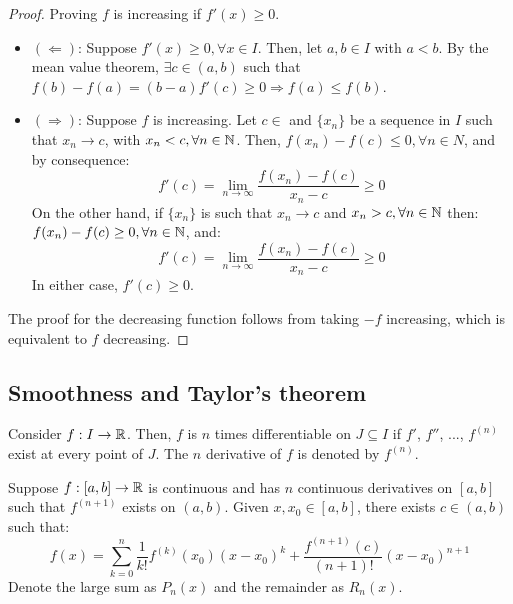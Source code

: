 \begin{proof}
    Proving $f$ is increasing if $f'(x) \geq 0$.
    \begin{itemize}
        \item $(\Longleftarrow)$: Suppose $f'(x) \geq 0, \forall x \in I$. Then, let $a,b \in I$ with $a < b$. By the mean value theorem, $\exists c \in (a,b)$ such that $f(b) - f(a) = (b-a)f'(c) \geq 0 \Longrightarrow f(a) \leq f(b)$.
        \item $(\Longrightarrow)$: Suppose $f$ is increasing. Let $c \in $ and $\{x_n\}$ be a sequence in $I$ such that $x_n \to c$, with $x_n < c, \forall n \in \mathbb{N}$. Then, $f(x_n) - f(c) \leq 0, \forall n \in N$, and by consequence:
            \begin{equation*}
                f'(c) = \lim \limits_{n \to \infty} \frac{f(x_n) - f(c)}{x_n - c} \geq 0
            \end{equation*}
            On the other hand, if $\{x_n\}$ is such that $x_n \to c$ and $x_n > c, \forall n \in \mathbb{N}$ then: $f(x_n) - f(c) \geq 0, \forall n \in \mathbb{N}$, and:
            \begin{equation*}
                f'(c) = \lim \limits_{n \to \infty} \frac{f(x_n) - f(c)}{x_n - c} \geq 0
            \end{equation*}
            In either case, $f'(c) \geq 0$.
    \end{itemize}
    The proof for the decreasing function follows from taking $-f$ increasing, which is equivalent to $f$ decreasing.
\end{proof}

\subsection{Smoothness and Taylor's theorem}

\begin{definition}
    Consider $f: I \to \mathbb{R}$. Then, $f$ is $n$ times differentiable on $J \subseteq I$ if $f'$, $f''$, ..., $f^(n)$ exist at every point of $J$. The $n$ derivative of $f$ is denoted by $f^(n)$.
\end{definition}

\begin{theorem}
    Suppose $f: [a,b] \to \mathbb{R}$ is continuous and has $n$ continuous derivatives on $[a,b]$ such that $f^{(n+1)}$ exists on $(a,b)$. Given $x, x_0 \in [a,b]$, there exists $c \in (a,b)$ such that:
    \begin{equation}
        f(x) = \sum \limits_{k = 0}^n \frac{1}{k!}f^{(k)}(x_0)(x-x_0)^k + \frac{f^{(n+1)}(c)}{(n+1)!}(x-x_0)^{n+1}
    \end{equation}
    Denote the large sum as $P_n(x)$ and the remainder as $R_n(x)$.
\end{theorem}

